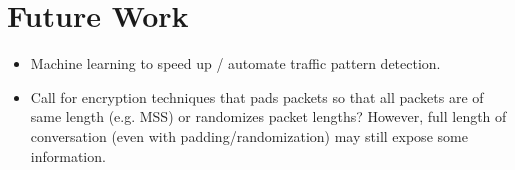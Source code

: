 \section{Future Work}
\label{sect:future-work}
{\color{red}
\begin{itemize}
\item Machine learning to speed up / automate traffic pattern detection.
\item Call for encryption techniques that pads packets so that all packets are of same length (e.g. MSS) or randomizes packet lengths? However, full length of conversation (even with padding/randomization) may still expose some information.
\end{itemize}
}